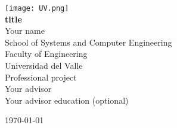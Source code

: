 \begin{titlepage}

	\centering
	\texttt{[image: UV.png]}  \\[1cm]
	{\LARGE\bfseries title} \\[3cm]

	{\large Your name} \\[0.5cm]

	{\large School of Systems and Computer Engineering} \\[0.3cm]
	{\large Faculty of Engineering} \\[0.3cm]
	{\large Universidad del Valle} \\[2cm]

	{\large Professional project} \\[0.5cm]

	{\large Your advisor} \\[0.3cm]
	{\normalsize Your advisor education (optional)} \\[2cm]

	\vfill

	{\today}
\end{titlepage}
